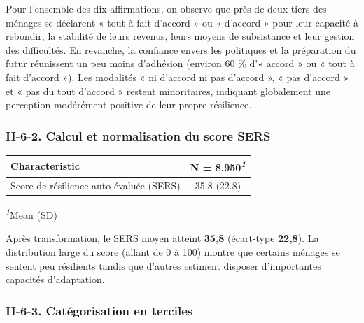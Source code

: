 \documentclass[
]{article}
\begin{document}
Pour l'ensemble des dix affirmations, on observe que près de deux tiers
des ménages se déclarent « tout à fait d'accord » ou « d'accord » pour
leur capacité à rebondir, la stabilité de leurs revenus, leurs moyens de
subsistance et leur gestion des difficultés. En revanche, la confiance
envers les politiques et la préparation du futur réunissent un peu moins
d'adhésion (environ 60 \% d'« accord » ou « tout à fait d'accord »). Les
modalités « ni d'accord ni pas d'accord », « pas d'accord » et « pas du
tout d'accord » restent minoritaires, indiquant globalement une
perception modérément positive de leur propre résilience.

\hypertarget{ii-6-2.-calcul-et-normalisation-du-score-sers}{%
\subsubsection{II-6-2. Calcul et normalisation du score
SERS}\label{ii-6-2.-calcul-et-normalisation-du-score-sers}}

\begin{table}[!t]
\fontsize{9.8pt}{11.7pt}\selectfont
\begin{tabular*}{\linewidth}{@{\extracolsep{\fill}}lc}
\toprule
\textbf{Characteristic} & \textbf{N = 8,950}\textsuperscript{\textit{1}} \\ 
\midrule\addlinespace[2.5pt]
Score de résilience auto-évaluée (SERS) & 35.8 (22.8) \\ 
\bottomrule
\end{tabular*}
\begin{minipage}{\linewidth}
\textsuperscript{\textit{1}}Mean (SD)\\
\end{minipage}
\end{table}

Après transformation, le SERS moyen atteint \textbf{35,8} (écart-type
\textbf{22,8}). La distribution large du score (allant de 0 à 100)
montre que certains ménages se sentent peu résilients tandis que
d'autres estiment disposer d'importantes capacités d'adaptation.

\hypertarget{ii-6-3.-catuxe9gorisation-en-terciles}{%
\subsubsection{II-6-3. Catégorisation en
terciles}\label{ii-6-3.-catuxe9gorisation-en-terciles}}
\end{document}
